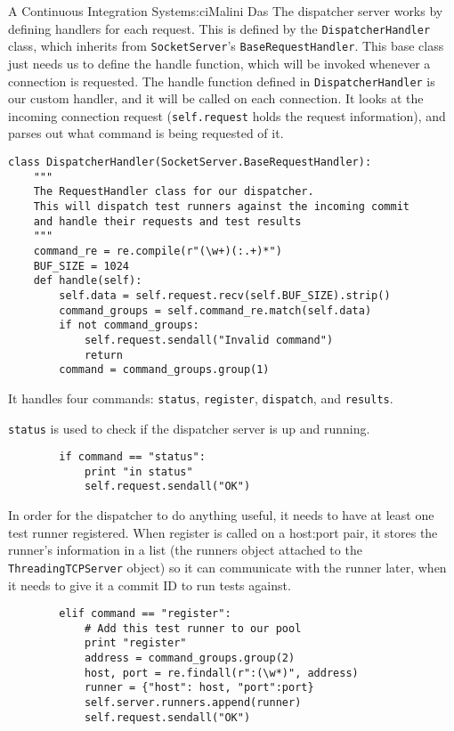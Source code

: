 \begin{aosachapter}{A Continuous Integration System}{s:ci}{Malini Das}
The dispatcher server works by defining handlers for each request. This
is defined by the \texttt{DispatcherHandler} class, which inherits from
\texttt{SocketServer}'s \texttt{BaseRequestHandler}. This base class
just needs us to define the handle function, which will be invoked
whenever a connection is requested. The handle function defined in
\texttt{DispatcherHandler} is our custom handler, and it will be called
on each connection. It looks at the incoming connection request
(\texttt{self.request} holds the request information), and parses out
what command is being requested of it.

\begin{verbatim}
class DispatcherHandler(SocketServer.BaseRequestHandler):
    """
    The RequestHandler class for our dispatcher.
    This will dispatch test runners against the incoming commit
    and handle their requests and test results
    """
    command_re = re.compile(r"(\w+)(:.+)*")
    BUF_SIZE = 1024
    def handle(self):
        self.data = self.request.recv(self.BUF_SIZE).strip()
        command_groups = self.command_re.match(self.data)
        if not command_groups:
            self.request.sendall("Invalid command")
            return
        command = command_groups.group(1)
\end{verbatim}

It handles four commands: \texttt{status}, \texttt{register},
\texttt{dispatch}, and \texttt{results}.

\texttt{status} is used to check if the dispatcher server is up and
running.

\begin{verbatim}
        if command == "status":
            print "in status"
            self.request.sendall("OK")
\end{verbatim}

In order for the dispatcher to do anything useful, it needs to have at
least one test runner registered. When register is called on a host:port
pair, it stores the runner's information in a list (the runners object
attached to the \texttt{ThreadingTCPServer} object) so it can
communicate with the runner later, when it needs to give it a commit ID
to run tests against.

\begin{verbatim}
        elif command == "register":
            # Add this test runner to our pool
            print "register"
            address = command_groups.group(2)
            host, port = re.findall(r":(\w*)", address)
            runner = {"host": host, "port":port}
            self.server.runners.append(runner)
            self.request.sendall("OK")
\end{verbatim}


\end{aosachapter}
